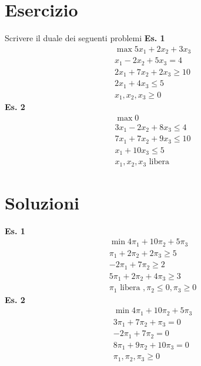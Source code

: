 \documentclass[a4paper, 11pt]{article}
\begin{document}
        \section*{Esercizio}
        Scrivere il duale dei seguenti problemi
        \newline
        \textbf{Es. 1}
        \begin{align*}
            \max 5x_1 + 2x_2 + 3x_3 \\
            x_1 - 2x_2 + 5x_3 = 4 \\
            2x_1 + 7x_2 + 2x_3 \geq 10 \\
            2x_1 + 4x_3 \leq 5 \\
            x_1, x_2, x_3 \geq 0
        \end{align*}
        \textbf{Es. 2}
        \begin{align*}
            \max 0 \\
            3x_1 - 2x_2 + 8x_3 \leq 4 \\
            7x_1 + 7x_2 + 9x_3 \leq 10 \\
            x_1 + 10x_3 \leq 5 \\
            x_1, x_2, x_3 \text{ libera }
        \end{align*}
        
        \section*{Soluzioni}
        \textbf{Es. 1}
        \begin{align*}
            \min 4\pi_1 + 10\pi_2 + 5\pi_3 \\
            \pi_1 + 2\pi_2 + 2\pi_3 \geq 5 \\
            -2\pi_1 + 7\pi_2 \geq 2 \\
            5\pi_1 + 2\pi_2 + 4\pi_3 \geq 3 \\
            \pi_1 \text{ libera }, \pi_2 \leq 0, \pi_3 \geq 0
        \end{align*}
        \textbf{Es. 2}
        \begin{align*}
            \min 4\pi_1 + 10\pi_2 + 5\pi_3 \\
            3\pi_1 + 7\pi_2 + \pi_3 = 0 \\
            -2\pi_1 + 7\pi_2 = 0 \\
            8\pi_1 + 9\pi_2 + 10\pi_3 = 0 \\
            \pi_1, \pi_2, \pi_3 \geq 0
        \end{align*}
        
\end{document}
